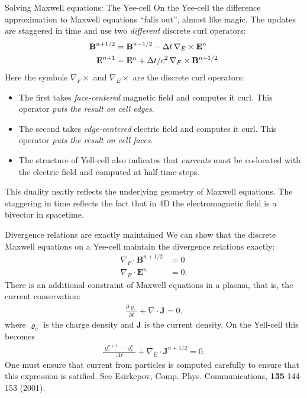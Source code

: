 \documentclass[pdf]{beamer}
\newcommand{\pfrac}[2]{\frac{\partial #1}{\partial #2}}
\newcommand{\mvec}[1]{\mathbf{#1}}
\theoremstyle{definition}
\begin{document}
\begin{frame}{Solving Maxwell equations: The Yee-cell}
  \small%
  On the Yee-cell the difference approximation to Maxwell equations
  ``falls out'', almost like magic. The updates are staggered in time
  and use two \emph{different} discrete curl operators:
  \begin{align*}
    \mvec{B}^{n+1/2} &= \mvec{B}^{n-1/2} - \Delta t\thinspace \nabla_E\times\mvec{E}^{n} \\    
    \mvec{E}^{n+1} &= \mvec{E}^n + \Delta t/c^2\thinspace \nabla_F\times\mvec{B}^{n+1/2}
  \end{align*}
  Here the symbols $\nabla_F\times$ and $\nabla_E\times$ are the
  discrete curl operators:
  \begin{itemize}
  \item The first takes \emph{face-centered} magnetic field and
    computes it curl. This operator \emph{puts the result on cell
      edges}.
  \item The second takes \emph{edge-centered} electric field and
    computes it curl. This operator \emph{puts the result on cell
      faces}.
  \item The structure of Yell-cell also indicates that \emph{currents}
    must be co-located with the electric field and computed at half
    time-steps.
  \end{itemize}
  This duality neatly reflects the underlying geometry of Maxwell
  equations. The staggering in time reflects the fact that in 4D the
  electromagnetic field is a bivector in spacetime.
\end{frame}

\begin{frame}{Divergence relations are exactly maintained}
  \small%
  We can show that the discrete Maxwell equations on a Yee-cell
  maintain the divergence relations exactly:
  \begin{align*}
    \nabla_F\cdot\mvec{B}^{n+1/2} &= 0 \\
    \nabla_E\cdot\mvec{E}^n &= 0.
  \end{align*}
  There is an additional constraint of Maxwell equations in a plasma,
  that is, the current conservation:
  \begin{align*}
    \pfrac{\varrho_c}{t} + \nabla\cdot\mvec{J} = 0.
  \end{align*}
  where $\varrho_c$ is the charge density and $\mvec{J}$ is the
  current density. On the Yell-cell this becomes
  \begin{align*}
    \frac{\varrho_c^{n+1}-\varrho_v^{n}}{\Delta t}
    +
    \nabla_E\cdot\mvec{J}^{n+1/2} = 0.    
  \end{align*}
  One must ensure that current from particles is computed carefully to
  ensure that this expression is satified. See Esirkepov,
  Comp. Phys. Communications, {\bf 135} 144-153 (2001).
\end{frame}
\end{document}
